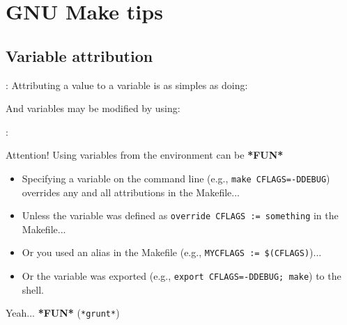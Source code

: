 \section{GNU Make tips}



\subsection{Variable attribution}
\begin{frame}{\secname: \small\subsecname\normalsize}
    Attributing a value to a variable is as simples as doing:

    \makeVar

    And variables may be modified by using:

    \makeAppendVar

\end{frame}

\begin{frame}{\secname: \small\subsecname\normalsize}
    \begin{alertblock}{Attention!}
        Using variables from the environment can be \textbf{*FUN*}
    \end{alertblock}

    \begin{itemize}
        \item Specifying a variable on the command line (e.g., \texttt{make CFLAGS=-DDEBUG}) overrides any and all attributions in the Makefile...
        \item Unless the variable was defined as \texttt{override CFLAGS := something} in the Makefile...
        \item Or you used an alias in the Makefile (e.g., \texttt{MYCFLAGS := \$(CFLAGS)})...
        \item Or the variable was exported (e.g., \texttt{export CFLAGS=-DDEBUG; make}) to the shell.
    \end{itemize}

    Yeah... \textbf{*FUN*} (\texttt{*grunt*})
\end{frame}

